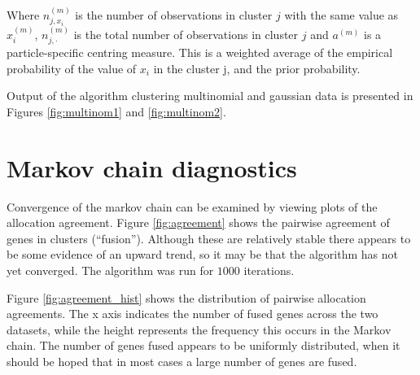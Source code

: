 \documentclass[10pt,a4paper]{article}
\begin{document}
Where $n_{j, x_i}^{(m)}$ is the number of observations in cluster $j$ with the same value as $x_i^{(m)}$,  $n_{j, \cdot}^{(m)}$ is the total number of observations in cluster $j$ and $a^{(m)}$ is a particle-specific centring measure. This is a weighted average of the empirical probability  of the value of $x_{i}$ in the cluster j, and the prior probability.

Output of the algorithm clustering multinomial and gaussian data is presented in Figures \ref{fig:multinom1} and \ref{fig:multinom2}.


\section{Markov chain diagnostics}
Convergence of the markov chain can be examined by viewing plots of the allocation agreement. Figure \ref{fig:agreement} shows the pairwise agreement of genes in clusters (``fusion''). Although these are relatively stable there appears to be some evidence of an upward trend, so it may be that the algorithm has not yet converged. The algorithm was run for $1000$ iterations.

Figure \ref{fig:agreement_hist} shows the distribution of pairwise allocation agreements. The x axis indicates the number of fused genes across the two datasets, while the height represents the frequency this occurs in the Markov chain. The number of genes fused appears to be uniformly distributed, when it should be hoped that in most cases a large number of genes are fused.
\end{document}
